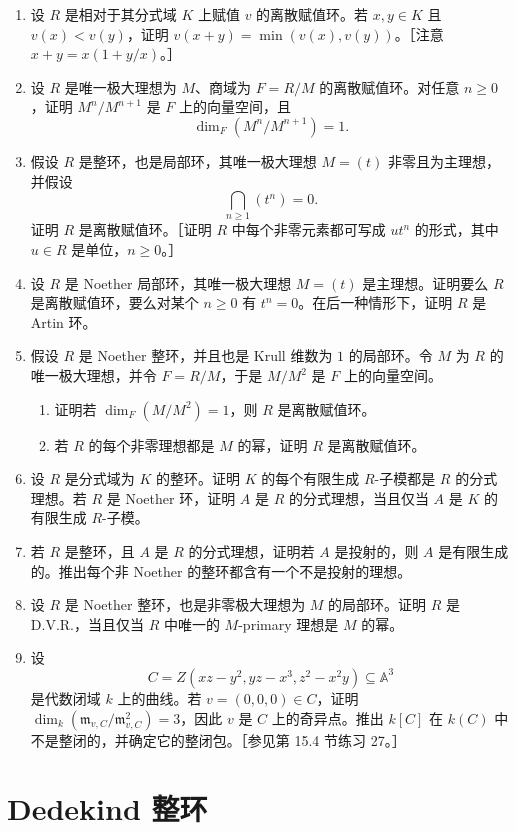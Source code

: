 \begin{enumerate}[label=\arabic*.]
  \item 设 $R$ 是相对于其分式域 $K$ 上赋值 $v$ 的离散赋值环。若 $x,y\in K$ 且 $v(x)<v(y)$，证明 $v(x+y)=\min(v(x),v(y))$。［注意 $x+y=x(1+y/x)$。］
  \item 设 $R$ 是唯一极大理想为 $M$、商域为 $F=R/M$ 的离散赋值环。对任意 $n\geq0$，证明 $M^n/M^{n+1}$ 是 $F$ 上的向量空间，且
  \[
    \dim_F(M^n/M^{n+1})=1.
  \]
  \item 假设 $R$ 是整环，也是局部环，其唯一极大理想 $M=(t)$ 非零且为主理想，并假设
  \[
    \bigcap_{n\geq1}(t^n)=0.
  \]
  证明 $R$ 是离散赋值环。［证明 $R$ 中每个非零元素都可写成 $ut^n$ 的形式，其中 $u\in R$ 是单位，$n\geq0$。］
  \item 设 $R$ 是 Noether 局部环，其唯一极大理想 $M=(t)$ 是主理想。证明要么 $R$ 是离散赋值环，要么对某个 $n\geq0$ 有 $t^n=0$。在后一种情形下，证明 $R$ 是 Artin 环。
  \item 假设 $R$ 是 Noether 整环，并且也是 Krull 维数为 $1$ 的局部环。令 $M$ 为 $R$ 的唯一极大理想，并令 $F=R/M$，于是 $M/M^2$ 是 $F$ 上的向量空间。
  \begin{enumerate}[label=(\alph*)]
    \item 证明若 $\dim_F(M/M^2)=1$，则 $R$ 是离散赋值环。
    \item 若 $R$ 的每个非零理想都是 $M$ 的幂，证明 $R$ 是离散赋值环。
  \end{enumerate}
  \item 设 $R$ 是分式域为 $K$ 的整环。证明 $K$ 的每个有限生成 $R$-子模都是 $R$ 的分式理想。若 $R$ 是 Noether 环，证明 $A$ 是 $R$ 的分式理想，当且仅当 $A$ 是 $K$ 的有限生成 $R$-子模。
  \item 若 $R$ 是整环，且 $A$ 是 $R$ 的分式理想，证明若 $A$ 是投射的，则 $A$ 是有限生成的。推出每个非 Noether 的整环都含有一个不是投射的理想。
  \item 设 $R$ 是 Noether 整环，也是非零极大理想为 $M$ 的局部环。证明 $R$ 是 D.V.R.，当且仅当 $R$ 中唯一的 $M$-primary 理想是 $M$ 的幂。
  \item 设
  \[
    C=Z(xz-y^2,
    yz-x^3,
    z^2-x^2y)\subseteq\mathbb A^3
  \]
  是代数闭域 $k$ 上的曲线。若 $v=(0,0,0)\in C$，证明 $\dim_k(\mathfrak m_{v,C}/\mathfrak m_{v,C}^2)=3$，因此 $v$ 是 $C$ 上的奇异点。推出 $k[C]$ 在 $k(C)$ 中不是整闭的，并确定它的整闭包。［参见第 15.4 节练习 27。］
\end{enumerate}

\section{Dedekind 整环}

